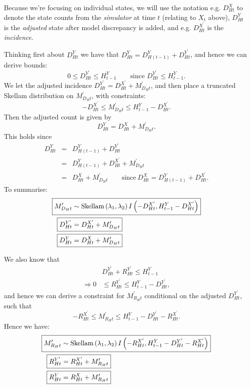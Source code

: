 \documentclass[a4paper]{article}
\begin{document}
Because we're focusing on individual states, we will use the notation e.g. $D^X_{Ht}$ to denote the state counts from the \textit{simulator} at time $t$ (relating to $X_t$ above), $D^Y_{Ht}$ is the \textit{adjusted} state after model discrepancy is added, and e.g. $D^{X^\prime}_{Ht}$ is the \textit{incidence}.

Thinking first about $D^Y_{Ht}$ we have that $D^Y_{Ht} = D^Y_{H(t - 1)} + D^{Y^\prime}_{Ht}$, and hence we can derive bounds:
\begin{equation*}
    0 \leq D^{Y^\prime}_{Ht} \leq H^Y_{t-1} \qquad \mbox{since $D^{Y^\prime}_{Ht} \leq H^Y_{t - 1}$}.
\end{equation*}
We let the adjusted incidence $D^{Y^\prime}_{Ht} = D^{X^\prime}_{Ht} + M^\prime_{D_Ht}$, and then place a truncated Skellam distribution on $M^\prime_{D_Ht}$, with constraints:
\begin{equation*}
    -D^{X^\prime}_{Ht} \leq M^\prime_{D_Ht} \leq H^Y_{t - 1} - D^{X^\prime}_{Ht}.
\end{equation*}
Then the adjusted count is given by
\begin{equation*}
    D^Y_{Ht} = D^X_{Ht} + M^\prime_{D_Ht}.
\end{equation*}
This holds since
\begin{eqnarray*}
    D^Y_{Ht} &=& D^Y_{H(t - 1)} + D^{Y^\prime}_{Ht}\\
    &=& D^Y_{H(t - 1)} + D^{X^\prime}_{Ht} + M^\prime_{D_Ht}\\
    &=& D^X_{Ht} + M^\prime_{D_Ht} \qquad \mbox{since}~D^X_{Ht} = D^Y_{H(t - 1)} + D^{X^\prime}_{Ht}.
\end{eqnarray*}
To summarise:
\begin{align*}
\Aboxed{M^\prime_{D_Ht} &\sim \mbox{Skellam}\left(\lambda_1, \lambda_2\right)I\left(-D^{X^\prime}_{Ht}, H^Y_{t - 1} - D^{X^\prime}_{Ht}\right)}\\
    \Aboxed{D^{Y^\prime}_{Ht} &= D^{X^\prime}_{Ht} + M^\prime_{D_Ht}}\\
    \Aboxed{D^Y_{Ht} &= D^X_{Ht} + M^\prime_{D_Ht}}
\end{align*}

We also know that
\begin{align*}
    &D^{Y^\prime}_{Ht} + R^{Y^\prime}_{Ht} \leq H^Y_{t - 1}\\
    \Rightarrow 0 &\leq R^{Y^\prime}_{Ht} \leq H^Y_{t - 1} - D^{Y^\prime}_{Ht},
\end{align*}
and hence we can derive a constraint for $M^\prime_{R_Ht}$ conditional on the adjusted $D^{Y^\prime}_{Ht}$, such that
\begin{equation*}
    -R^{X^\prime}_{Ht} \leq M^\prime_{R_Ht} \leq H^Y_{t - 1} - D^{Y^\prime}_{Ht} - R^{X^\prime}_{Ht}.
\end{equation*}
Hence we have:
\begin{align*}
\Aboxed{M^\prime_{R_Ht} &\sim \mbox{Skellam}\left(\lambda_1, \lambda_2\right)I\left(-R^{X^\prime}_{Ht}, H^Y_{t - 1} - D^{Y^\prime}_{Ht} - R^{X^\prime}_{Ht}\right)}\\
    \Aboxed{R^{Y^\prime}_{Ht} &= R^{X^\prime}_{Ht} + M^\prime_{R_Ht}}\\
    \Aboxed{R^Y_{Ht} &= R^X_{Ht} + M^\prime_{R_Ht}}
\end{align*}
\end{document}
